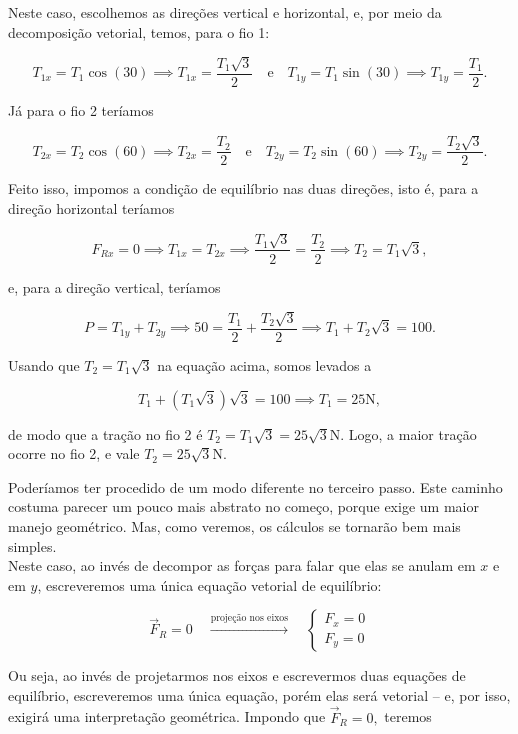 \begin{exemplo}[Nível II]
\begin{enumerate}
    Neste caso, escolhemos as direções vertical e horizontal, e, por meio da decomposição vetorial, temos, para o fio 1:

    $$ T_{1x} = T_1 \cos (30) \implies \boxed{T_{1x}=\dfrac{T_1 \sqrt{3}}{2}} \quad \text{e} \quad  T_{1y} = T_1 \sin (30) \implies \boxed{T_{1y}=\dfrac{T_1} {2}.}  $$

    Já para o fio 2 teríamos

     $$ T_{2x} = T_2 \cos (60) \implies \boxed{T_{2x}=\dfrac{T_2}{2}} \quad \text{e} \quad  T_{2y} = T_2 \sin (60) \implies \boxed{T_{2y}=\dfrac{T_2 \sqrt3} {2}.}  $$

     Feito isso, impomos a condição de equilíbrio nas duas direções, isto é, para a direção horizontal teríamos

     $$ F_{Rx} = 0 \implies T_{1x} = T_{2x} \implies  \dfrac{T_1 \sqrt{3}}{2} = \dfrac{T_2}{2} \implies \boxed{T_2=T_1\sqrt 3,}$$

     \noindent e, para a direção vertical, teríamos

     $$ P = T_{1y}+T_{2y} \implies 50 = \dfrac{T_1}{2} + \dfrac{T_2 \sqrt 3}{2} \implies \boxed{T_1 + T_2 \sqrt 3 = 100.}$$

     Usando que $T_2=T_1 \sqrt 3$ na equação acima, somos levados a 

     $$T_1 + (T_1 \sqrt3) \sqrt 3 = 100 \implies T_1 = 25\text{N},$$

     \noindent de modo que a tração no fio 2 é $T_2=T_1 \sqrt 3= 25\sqrt3 \text{N}.$ Logo, a maior tração ocorre no fio 2, e vale $T_2 = 25\sqrt3 \text{N}.$

     
\end{enumerate}

Poderíamos ter procedido de um modo diferente no terceiro passo. Este caminho costuma parecer um pouco mais abstrato no começo, porque exige um maior manejo geométrico. Mas, como veremos, os cálculos se tornarão bem mais simples. \\

Neste caso, ao invés de decompor as forças para falar que elas se anulam em $x$ e em $y$, escreveremos uma única equação vetorial de equilíbrio: 


\[
 \vec{F}_R = 0
\quad \xrightarrow{\text{projeção nos eixos}}
\quad
\begin{cases}
F_x = 0 \\
F_y = 0
\end{cases}
\]

Ou seja, ao invés de projetarmos nos eixos e escrevermos duas equações de equilíbrio, escreveremos uma única equação, porém elas será vetorial -- e, por isso, exigirá uma interpretação geométrica. Impondo que $\vec{F}_R=0,$ teremos


\end{exemplo}
